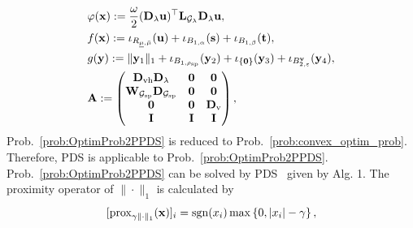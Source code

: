 \begin{align}
	\label{eq:FuncMapping}
    & \varphi (\mathbf{x}) := \frac{\omega}{2} (\mathbf{D}_{\lambda} \mathbf{u})^{\top} \mathbf{L}_{\mathcal{G}_{\lambda}} \mathbf{D}_{\lambda} \mathbf{u}, \notag \\
	& f (\mathbf{x}) := \iota_{R_{\underline{\mu},\bar{\mu}}} (\mathbf{u}) + \iota_{B_{1, \alpha}} (\mathbf{s}) + \iota_{B_{1, \beta}} (\mathbf{t}), \nonumber \\
	& g (\mathbf{y}) := \|\mathbf{y}_{1} \|_{1} + \iota_{B_{1, \rho_{\text{sp}}}} (\mathbf{y}_{2}) + \iota_{\{ \mathbf{0} \}} (\mathbf{y}_{3}) + \iota_{B_{2, \varepsilon}^{\mathbf{v}}} (\mathbf{y}_{4}), \notag \\
    & \mathbf{A} := 
    \begin{pmatrix}
        \mathbf{D}_{\text{vh}} \mathbf{D}_{\lambda} & \mathbf{0} & \mathbf{0} \\
        \mathbf{W}_{\mathcal{G}_{\text{sp}}} \mathbf{D}_{\mathcal{G}_{\text{sp}}} & \mathbf{0} & \mathbf{0} \\
        \mathbf{0} & \mathbf{0} & \mathbf{D}_{\text{v}} \\
        \mathbf{I} & \mathbf{I} & \mathbf{I}
    \end{pmatrix},
\end{align}
Prob.~\eqref{prob:OptimProb2PPDS} is reduced to Prob.~\eqref{prob:convex_optim_prob}. 
Therefore, PDS is applicable to Prob.~\eqref{prob:OptimProb2PPDS}.
Prob.~\eqref{prob:OptimProb2PPDS} can be solved by PDS~\cite{Pock2011PPDS} given by Alg. 1.
The proximity operator of $\| \cdot \|_{1}$ is calculated by
\begin{equation}
    \label{eq:ProxL1norm}
    \lbrack \operatorname{prox}_{\gamma_{} \| \cdot \|_1}(\mathbf{x}) \rbrack_{i} = \operatorname{sgn}(x_{i}) \max \left\{ 0, |x_{i}| - \gamma_{} \right\},
\end{equation}
